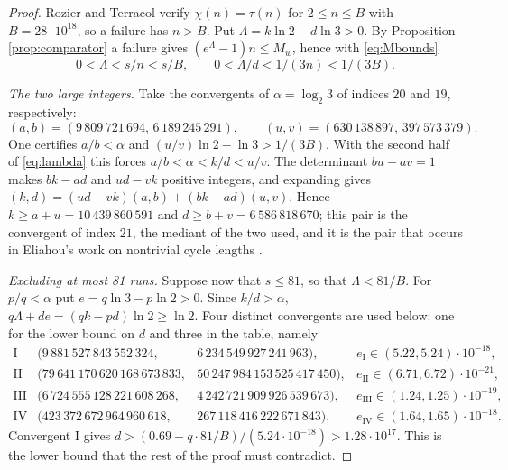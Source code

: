 \documentclass[11pt,a4paper]{article}
\theoremstyle{plain}\newtheorem{theorem}{Theorem}\newtheorem{proposition}[theorem]{Proposition}
\theoremstyle{definition}\newtheorem{example}[theorem]{Example}
\theoremstyle{remark}\newtheorem{remark}[theorem]{Remark}
\begin{document}
\begin{proof}
Rozier and Terracol \cite[Cor.~5.4]{rozier2026} verify $\chi(n)=\tau(n)$ for $2\le n\le B$ with
$B=28\cdot10^{18}$, so a failure has $n>B$. Put $\Lambda=k\ln2-d\ln3>0$. By
Proposition \ref{prop:comparator} a failure gives $(e^\Lambda-1)n\le M_w$, hence with
\eqref{eq:Mbounds}
\begin{equation}\label{eq:lambda}
0<\Lambda<s/n<s/B,\qquad 0<\Lambda/d<1/(3n)<1/(3B).
\end{equation}

\emph{The two large integers.} Take the convergents of $\alpha=\log_2 3$ of indices
$20$ and $19$, respectively:
\[
 (a,b)=(9\,809\,721\,694,\,6\,189\,245\,291),\qquad
 (u,v)=(630\,138\,897,\,397\,573\,379).
\]
One certifies $a/b<\alpha$ and $(u/v)\ln2-\ln3>1/(3B)$. With the second half of
\eqref{eq:lambda} this forces $a/b<\alpha<k/d<u/v$. The determinant $bu-av=1$ makes $bk-ad$ and
$ud-vk$ positive integers, and expanding gives $(k,d)=(ud-vk)(a,b)+(bk-ad)(u,v)$. Hence
$k\ge a+u=10\,439\,860\,591$ and $d\ge b+v=6\,586\,818\,670$; this pair is the convergent of index
$21$, the mediant of the two used, and it is the pair that occurs in Eliahou's work on nontrivial
cycle lengths \cite{eliahou1993}.

\emph{Excluding at most 81 runs.} Suppose now that $s\le81$, so that $\Lambda<81/B$.
For $p/q<\alpha$ put $e=q\ln3-p\ln2>0$. Since $k/d>\alpha$,
$q\Lambda+de=(qk-pd)\ln2\ge\ln2$. Four distinct convergents are used below: one for the lower
bound on $d$ and three in the table, namely
\[
\begin{array}{llll}
 \mathrm{I} & (9\,881\,527\,843\,552\,324, & 6\,234\,549\,927\,241\,963), &
   e_{\mathrm{I}}\in(5.22,5.24)\cdot10^{-18},\\
 \mathrm{II} & (79\,641\,170\,620\,168\,673\,833, & 50\,247\,984\,153\,525\,417\,450), &
   e_{\mathrm{II}}\in(6.71,6.72)\cdot10^{-21},\\
 \mathrm{III} & (6\,724\,555\,128\,221\,608\,268, & 4\,242\,721\,909\,926\,539\,673), &
   e_{\mathrm{III}}\in(1.24,1.25)\cdot10^{-19},\\
 \mathrm{IV} & (423\,372\,672\,964\,960\,618, & 267\,118\,416\,222\,671\,843), &
   e_{\mathrm{IV}}\in(1.64,1.65)\cdot10^{-18}.
\end{array}
\]
Convergent I gives
$d>(0.69-q\cdot81/B)/(5.24\cdot10^{-18})>1.28\cdot10^{17}$. This is the lower bound that the
rest of the proof must contradict.


\end{proof}
\end{document}
